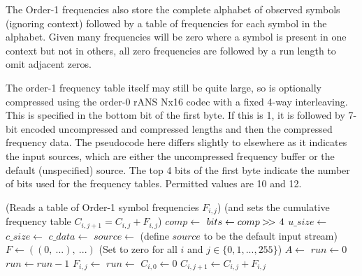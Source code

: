\documentclass[a4paper]{article}
\begin{document}
The Order-1 frequencies also store the complete alphabet of
observed symbols (ignoring context) followed by a table of frequencies for
each symbol in the alphabet.  Given many frequencies will be zero
where a symbol is present in one context but not in others, all zero
frequencies are followed by a run length to omit adjacent zeros.

The order-1 frequency table itself may still be quite large, so is
optionally compressed using the order-0 rANS Nx16 codec with a fixed
4-way interleaving.
This is specified in the bottom bit of the first byte.  If this is 1, it is
followed by 7-bit encoded uncompressed and compressed lengths and then
the compressed frequency data.  The pseudocode here differs slightly
to elsewhere as it indicates the input sources, which are either the
uncompressed frequency buffer or the default (unspecified) source.
The top 4 bits of the first byte indicate the number of bits used for
the frequency tables.  Permitted values are 10 and 12.


\begin{algorithmic}[1]
\Statex (Reads a table of Order-1 symbol frequencies $F_{i,j}$)
\Statex (and sets the cumulative frequency table $C_{i,j+1} = C_{i,j}+F_{i,j}$)
\State $comp \gets$ 
\State $bits \gets comp \mathbin{>\mkern-3mu>\,} 4$
  \State $u\_size \gets$  
  \State $c\_size \gets$  
  \State $c\_data \gets$ 
  \State $source \gets$  
\Else
  \State (define $source$ to be the default input stream)
\EndIf
\Statex
\State $F \gets ((0,\ ...),\ ...)$ \Comment(Set to zero for all $i$ and $j  \in \{0, 1, ..., 255\}$)
\State $A \gets$ 
  \State $run \gets 0$
      \State $run \gets run-1$ 
    \Else
      \State $F_{i,j} \gets$ 
        \State $run \gets$ 
      \EndIf
    \EndIf
  \EndForeach
  \State {}
  \State
  \State $C_{i,0} \gets 0$
    \State $C_{i,j+1} \gets C_{i,j} + F_{i,j}$
  \EndFor
\EndForeach
\EndProcedure
\end{algorithmic}
\end{document}
